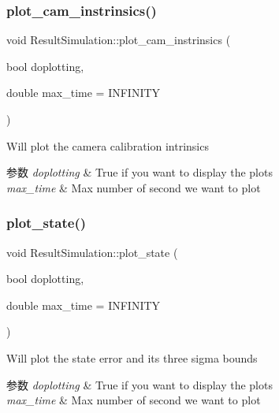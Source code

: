 \subsubsection{\texorpdfstring{plot\+\_\+cam\+\_\+instrinsics()}{plot\_cam\_instrinsics()}}
{\footnotesize\ttfamily void Result\+Simulation\+::plot\+\_\+cam\+\_\+instrinsics (\begin{DoxyParamCaption}\item[{bool}]{doplotting,  }\item[{double}]{max\+\_\+time = {\ttfamily INFINITY} }\end{DoxyParamCaption})}



Will plot the camera calibration intrinsics 


\begin{DoxyParams}{参数}
{\em doplotting} & True if you want to display the plots \\
\hline
{\em max\+\_\+time} & Max number of second we want to plot \\
\hline
\end{DoxyParams}
\mbox{\label{classov__eval_1_1ResultSimulation_aa7e8b0be0f423f9b77d29b0fb41cc715}} 
\subsubsection{\texorpdfstring{plot\+\_\+state()}{plot\_state()}}
{\footnotesize\ttfamily void Result\+Simulation\+::plot\+\_\+state (\begin{DoxyParamCaption}\item[{bool}]{doplotting,  }\item[{double}]{max\+\_\+time = {\ttfamily INFINITY} }\end{DoxyParamCaption})}



Will plot the state error and its three sigma bounds 


\begin{DoxyParams}{参数}
{\em doplotting} & True if you want to display the plots \\
\hline
{\em max\+\_\+time} & Max number of second we want to plot \\
\hline
\end{DoxyParams}
\mbox{\label{classov__eval_1_1ResultSimulation_a3d927f6bd6eaf6eba2b5a067920ef662}} 
